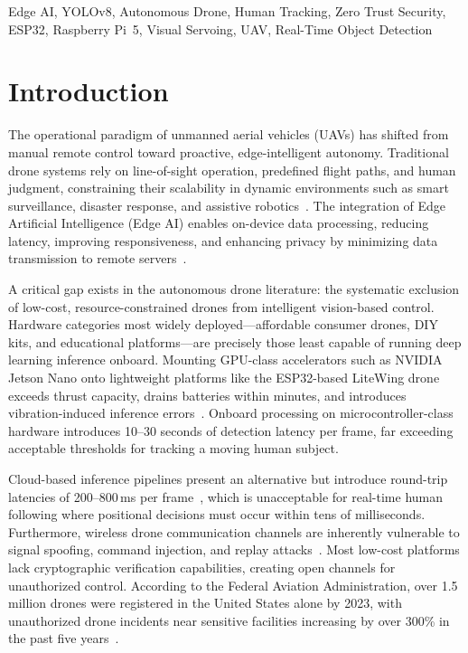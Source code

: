 \documentclass[conference]{IEEEtran}
\begin{document}
\begin{IEEEkeywords}
Edge AI, YOLOv8, Autonomous Drone, Human Tracking, Zero Trust Security, ESP32, Raspberry Pi~5, Visual Servoing, UAV, Real-Time Object Detection
\end{IEEEkeywords}

\section{Introduction}
\label{sec:intro}

The operational paradigm of unmanned aerial vehicles (UAVs) has shifted from manual remote control toward proactive, edge-intelligent autonomy. Traditional drone systems rely on line-of-sight operation, predefined flight paths, and human judgment, constraining their scalability in dynamic environments such as smart surveillance, disaster response, and assistive robotics~\cite{corke2017}. The integration of Edge Artificial Intelligence (Edge AI) enables on-device data processing, reducing latency, improving responsiveness, and enhancing privacy by minimizing data transmission to remote servers~\cite{nvidia_jetson}.

A critical gap exists in the autonomous drone literature: the systematic exclusion of low-cost, resource-constrained drones from intelligent vision-based control. Hardware categories most widely deployed---affordable consumer drones, DIY kits, and educational platforms---are precisely those least capable of running deep learning inference onboard. Mounting GPU-class accelerators such as NVIDIA Jetson Nano onto lightweight platforms like the ESP32-based LiteWing drone exceeds thrust capacity, drains batteries within minutes, and introduces vibration-induced inference errors~\cite{litewing2024}. Onboard processing on microcontroller-class hardware introduces 10--30 seconds of detection latency per frame, far exceeding acceptable thresholds for tracking a moving human subject.

Cloud-based inference pipelines present an alternative but introduce round-trip latencies of 200--800\,ms per frame~\cite{bresciani2008}, which is unacceptable for real-time human following where positional decisions must occur within tens of milliseconds. Furthermore, wireless drone communication channels are inherently vulnerable to signal spoofing, command injection, and replay attacks~\cite{nist_zt}. Most low-cost platforms lack cryptographic verification capabilities, creating open channels for unauthorized control. According to the Federal Aviation Administration, over 1.5 million drones were registered in the United States alone by 2023, with unauthorized drone incidents near sensitive facilities increasing by over 300\% in the past five years~\cite{scaramuzza2011}.
\end{document}

